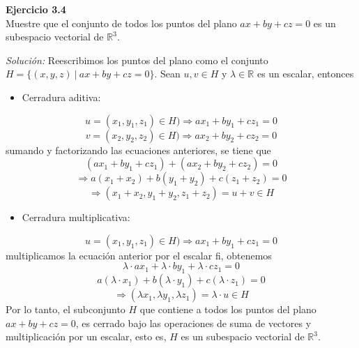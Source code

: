 \documentclass{article}
\newenvironment{problem}[2][Ejercicio]
    { \begin{mdframed}[backgroundcolor=gray!20] \textbf{#1 #2} \\}
    {  \end{mdframed}}
\newenvironment{solution}
    {\textit{Solución:}}
    {}
\begin{document}
\begin{problem}{3.4}
    Muestre que el conjunto de todos los puntos del plano $ax +by +cz = 0$ es un subespacio vectorial de $\mathbb{R}^3$.
\end{problem}
\begin{solution}
    Reescribimos los puntos del plano como el conjunto $H = \{ (x, y, z) \ | \ ax + by + cz = 0 \}$. Sean $u,v\in H$ y $\lambda \in \mathbb{R}$ es un escalar, entonces
\begin{itemize}
\item 
Cerradura aditiva:
\end{itemize}
\[
u = (x_1, y_1, z_1) \in H ) \Rightarrow ax_1 + by_1 + cz_1 = 0
\]\[
v = (x_2, y_2, z_2) \in H ) \Rightarrow ax_2 + by_2 + cz_2 = 0
\]
sumando y factorizando las ecuaciones anteriores, se tiene que
\[
(ax_1 + by_1 + cz_1) + (ax_2 + by_2 + cz_2) = 0
\]\[
\Rightarrow a (x_1 + x_2) + b(y_1 + y_2) + c (z_1 + z_2) = 0
\]\[
\Rightarrow (x_1 + x_2, y_1 + y_2, z_1 + z_2) = u + v \in H
\]\begin{itemize}
\item 
Cerradura multiplicativa:
\end{itemize}
\[
u = (x_1, y_1, z_1) \in H ) \Rightarrow ax_1 + by_1 + cz_1 = 0
\]
multiplicamos la ecuación anterior por el escalar fi, obtenemos
\[
\lambda \cdot ax_1 + \lambda \cdot by_1 + \lambda \cdot cz_1 = 0
\]\[
a (\lambda \cdot x_1) + b(\lambda \cdot y_1) + c(\lambda \cdot z_1) = 0
\]\[
\Rightarrow (\lambda x_1, \lambda y_1,  \lambda z_1) = \lambda\cdot u \in H
\]
Por lo tanto, el subconjunto $H$ que contiene a todos los puntos del plano $ax + by + cz = 0$, es cerrado bajo las operaciones de suma de vectores y multiplicación por un escalar, esto es, $H$ es un subespacio vectorial de $\mathbb{R}^3$.
\end{solution}
\end{document}
